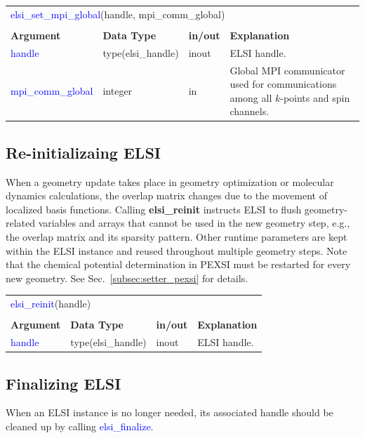 \documentclass{report}
\newcommand{\tcb}[1]{\textcolor{blue}{#1}}
\begin{document}
\begin{tabular}[]{|p{30mm}|p{30mm}|p{15mm}|p{90mm}|}
\multicolumn{4}{l}{\tcb{elsi\_set\_mpi\_global}(handle, mpi\_comm\_global)}\\
\multicolumn{4}{l}{}\\
\hline
\multicolumn{1}{|l|}{\textbf{Argument}} & \multicolumn{1}{l|}{\textbf{Data Type}} & \multicolumn{1}{l|}{\textbf{in/out}} & \multicolumn{1}{l|}{\textbf{Explanation}}\\
\hline
\tcb{handle}            & type(elsi\_handle) & inout & ELSI handle.\\
\hline
\tcb{mpi\_comm\_global} & integer            & in    & Global MPI communicator used for communications among all $k$-points and spin channels.\\
\hline
\end{tabular}

\subsection{Re-initializaing ELSI}
\label{subsec:setup_reinit}
When a geometry update takes place in geometry optimization or molecular dynamics calculations, the overlap matrix changes due to the movement of localized basis functions. Calling \textbf{elsi\_reinit} instructs ELSI to flush geometry-related variables and arrays that cannot be used in the new geometry step, e.g., the overlap matrix and its sparsity pattern. Other runtime parameters are kept within the ELSI instance and reused throughout multiple geometry steps. Note that the chemical potential determination in PEXSI must be restarted for every new geometry. See Sec.~\ref{subsec:setter_pexsi} for details.

\begin{tabular}[]{|p{30mm}|p{30mm}|p{15mm}|p{90mm}|}
\multicolumn{4}{l}{\tcb{elsi\_reinit}(handle)}\\
\multicolumn{4}{l}{}\\
\hline
\multicolumn{1}{|l|}{\textbf{Argument}} & \multicolumn{1}{l|}{\textbf{Data Type}} & \multicolumn{1}{l|}{\textbf{in/out}} & \multicolumn{1}{l|}{\textbf{Explanation}}\\
\hline
\tcb{handle} & type(elsi\_handle) & inout & ELSI handle.\\
\hline
\end{tabular}

\subsection{Finalizing ELSI}
\label{subsec:setup_final}
When an ELSI instance is no longer needed, its associated handle should be cleaned up by calling \tcb{elsi\_finalize}.
\end{document}
